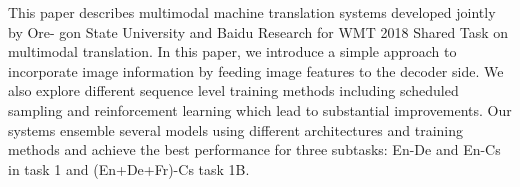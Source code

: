 This paper describes multimodal machine translation systems developed jointly by Ore- gon State University and Baidu Research for WMT 2018 Shared Task on multimodal translation. In this paper, we introduce a simple approach to incorporate image information by feeding image features to the decoder side. We also explore different sequence level training methods including scheduled sampling and reinforcement learning which lead to substantial improvements. Our systems ensemble several models using different architectures and training methods and achieve the best performance for three subtasks: En-De and En-Cs in task 1 and (En+De+Fr)-Cs task 1B.
